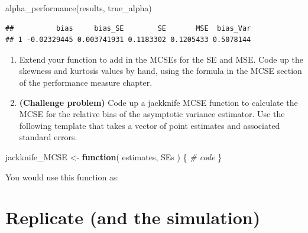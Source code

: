\documentclass[
]{book}
\newenvironment{Shaded}{\begin{snugshade}}{\end{snugshade}}
\newcommand{\CommentTok}[1]{\textcolor[rgb]{0.56,0.35,0.01}{\textit{#1}}}
\newcommand{\ControlFlowTok}[1]{\textcolor[rgb]{0.13,0.29,0.53}{\textbf{#1}}}
\newcommand{\FunctionTok}[1]{\textcolor[rgb]{0.00,0.00,0.00}{#1}}
\newcommand{\NormalTok}[1]{#1}
\newcommand{\OtherTok}[1]{\textcolor[rgb]{0.56,0.35,0.01}{#1}}
\newcommand{\SpecialCharTok}[1]{\textcolor[rgb]{0.00,0.00,0.00}{#1}}
\begin{document}
\begin{Shaded}
\begin{Highlighting}[]
\FunctionTok{alpha\_performance}\NormalTok{(results, true\_alpha)}
\end{Highlighting}
\end{Shaded}

\begin{verbatim}
##          bias     bias_SE        SE       MSE  bias_Var
## 1 -0.02329445 0.003741931 0.1183302 0.1205433 0.5078144
\end{verbatim}

\begin{enumerate}
\def\labelenumi{\arabic{enumi}.}
\setcounter{enumi}{5}
\item
  Extend your function to add in the MCSEs for the SE and MSE. Code up the skewness and kurtosis values by hand, using the formula in the MCSE section of the performance measure chapter.
\item
  \textbf{(Challenge problem)} Code up a jackknife MCSE function to calculate the MCSE for the relative bias of the asymptotic variance estimator.
  Use the following template that takes a vector of point estimates and associated standard errors.
\end{enumerate}

\begin{Shaded}
\begin{Highlighting}[]
\NormalTok{jackknife\_MCSE }\OtherTok{\textless{}{-}} \ControlFlowTok{function}\NormalTok{( estimates, SEs ) \{}
  \CommentTok{\# code}
\NormalTok{\}}
\end{Highlighting}
\end{Shaded}

You would use this function as:

\begin{Shaded}
\end{Shaded}

\hypertarget{replicate-and-the-simulation}{%
\section{Replicate (and the simulation)}\label{replicate-and-the-simulation}}
\end{document}
